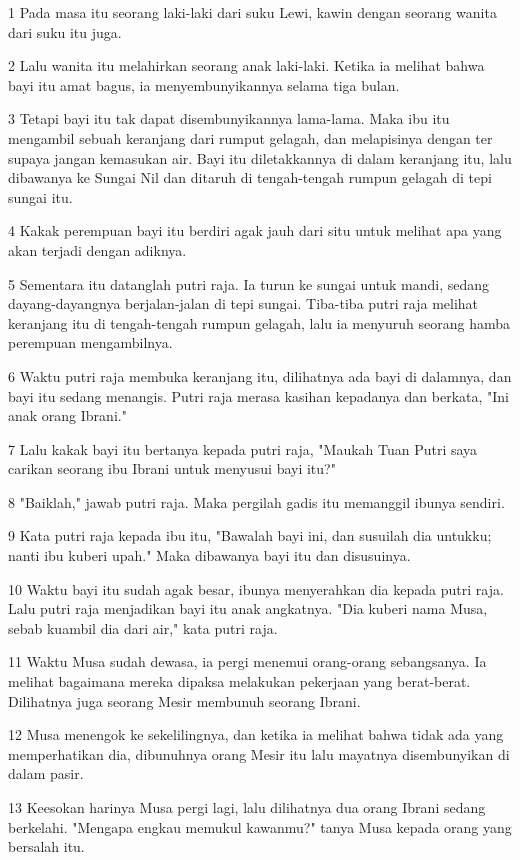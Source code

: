 \par 1 Pada masa itu seorang laki-laki dari suku Lewi, kawin dengan seorang wanita dari suku itu juga.
\par 2 Lalu wanita itu melahirkan seorang anak laki-laki. Ketika ia melihat bahwa bayi itu amat bagus, ia menyembunyikannya selama tiga bulan.
\par 3 Tetapi bayi itu tak dapat disembunyikannya lama-lama. Maka ibu itu mengambil sebuah keranjang dari rumput gelagah, dan melapisinya dengan ter supaya jangan kemasukan air. Bayi itu diletakkannya di dalam keranjang itu, lalu dibawanya ke Sungai Nil dan ditaruh di tengah-tengah rumpun gelagah di tepi sungai itu.
\par 4 Kakak perempuan bayi itu berdiri agak jauh dari situ untuk melihat apa yang akan terjadi dengan adiknya.
\par 5 Sementara itu datanglah putri raja. Ia turun ke sungai untuk mandi, sedang dayang-dayangnya berjalan-jalan di tepi sungai. Tiba-tiba putri raja melihat keranjang itu di tengah-tengah rumpun gelagah, lalu ia menyuruh seorang hamba perempuan mengambilnya.
\par 6 Waktu putri raja membuka keranjang itu, dilihatnya ada bayi di dalamnya, dan bayi itu sedang menangis. Putri raja merasa kasihan kepadanya dan berkata, "Ini anak orang Ibrani."
\par 7 Lalu kakak bayi itu bertanya kepada putri raja, "Maukah Tuan Putri saya carikan seorang ibu Ibrani untuk menyusui bayi itu?"
\par 8 "Baiklah," jawab putri raja. Maka pergilah gadis itu memanggil ibunya sendiri.
\par 9 Kata putri raja kepada ibu itu, "Bawalah bayi ini, dan susuilah dia untukku; nanti ibu kuberi upah." Maka dibawanya bayi itu dan disusuinya.
\par 10 Waktu bayi itu sudah agak besar, ibunya menyerahkan dia kepada putri raja. Lalu putri raja menjadikan bayi itu anak angkatnya. "Dia kuberi nama Musa, sebab kuambil dia dari air," kata putri raja.
\par 11 Waktu Musa sudah dewasa, ia pergi menemui orang-orang sebangsanya. Ia melihat bagaimana mereka dipaksa melakukan pekerjaan yang berat-berat. Dilihatnya juga seorang Mesir membunuh seorang Ibrani.
\par 12 Musa menengok ke sekelilingnya, dan ketika ia melihat bahwa tidak ada yang memperhatikan dia, dibunuhnya orang Mesir itu lalu mayatnya disembunyikan di dalam pasir.
\par 13 Keesokan harinya Musa pergi lagi, lalu dilihatnya dua orang Ibrani sedang berkelahi. "Mengapa engkau memukul kawanmu?" tanya Musa kepada orang yang bersalah itu.
